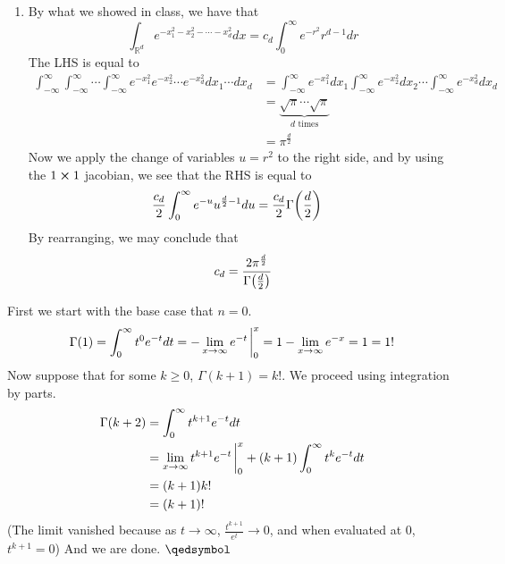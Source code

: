 \documentclass[12pt]{article}
\theoremstyle{definition}
\theoremstyle{remark}
\newcommand{\R}{\mathbb{R}}
\renewcommand{\qed}{\hfill\qedsymbol}
\begin{document}
\begin{enumerate}[leftmargin=\labelsep]
		\item By what we showed in class, we have that
		\[ \int_{\R^d} e^{-x_1^2-x_2^2-\cdots-x_d^2} dx = c_d \int_0^\infty e^{-r^2}r^{d-1}dr \]
		The LHS is equal to 
		\begin{align*}
			\int_{-\infty}^\infty \int_{-\infty}^\infty \cdots \int_{-\infty}^\infty e^{-x_1^2}e^{-x_2^2}\cdots e^{-x_d^2}dx_1 \cdots dx_d &= \int_{-\infty}^\infty e^{-x_1^2}dx_1 \int_{-\infty}^\infty e^{-x_2^2}dx_2 \cdots \int_{-\infty}^\infty e^{-x_d^2}dx_d \\
			&= \underbrace{\sqrt{\pi} \cdots \sqrt{\pi}}_{\text{$d$ times}} \\
			&= \pi^{\frac d2}
		\end{align*}
		Now we apply the change of variables $u = r^2$ to the right side, and by using the $1 \cross 1$ jacobian, we see that the RHS is equal to
		\begin{align*}
			\frac{c_d}2 \int_0^\infty e^{-u} u^{\frac d2 - 1} du &= \frac{c_d}2 \Gamma \qty(\frac d2)
		\end{align*}
		By rearranging, we may conclude that \[c_d = \frac{2\pi^{\frac d2}}{\Gamma\qty(\frac d2)}\]
	\end{enumerate}

	First we start with the base case that $n=0$. 
	\begin{align*}
		\Gamma(1) = \int_0^\infty t^0 e^{-t}dt = -\lim_{x \to \infty} e^{-t} \eval_0^x = 1-\lim_{x \to \infty} e^{-x}=1=1!
	\end{align*}
	Now suppose that for some $k \geq 0$, $\Gamma(k+1)=k!$. We proceed using integration by parts. 
	\begin{align*}
		\Gamma(k+2) &= \int_0^\infty t^{k+1}e^{-t}dt \\
		&= \lim_{x \to \infty} t^{k+1}e^{-t} \eval_0^x + (k+1)\int_0^\infty t^ke^{-t}dt \\
		&= (k+1)k! \\
		&= (k+1)!
	\end{align*}
	(The limit vanished because as $t \to \infty$, $\frac{t^{k+1}}{e^t} \to 0$, and when evaluated at 0, $t^{k+1}=0$) And we are done. $\qed$
\end{document}
